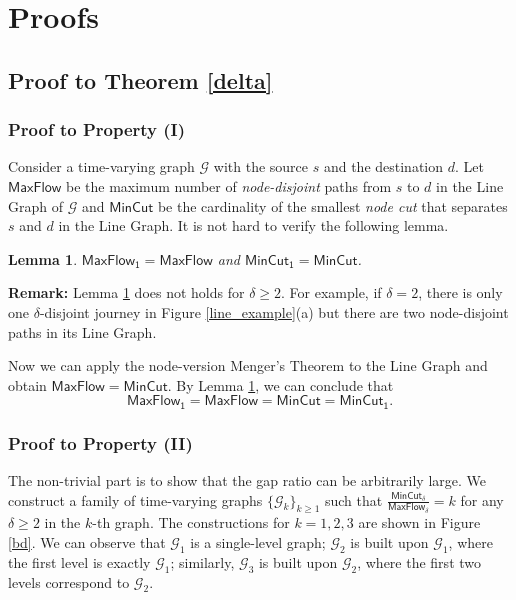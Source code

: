 \documentclass[10pt, conference, letterpaper]{IEEEtran}
\newtheorem{lemma}{Lemma}
\begin{document}
\appendix
\section{Proofs}
\subsection{Proof to Theorem \ref{delta}} \label{proof-delta}
\subsubsection{Proof to Property (I)}
Consider a time-varying graph $\mathcal{G}$ with the source $s$ and the destination $d$.
Let $\mathsf{MaxFlow}$ be the maximum number of \emph{node-disjoint} paths from $s$ to $d$ in the Line Graph of $\mathcal{G}$ and $\mathsf{MinCut}$ be the cardinality of the smallest \emph{node cut} that separates $s$ and $d$ in the Line Graph. It is not hard to verify the following lemma.
\begin{lemma}\label{line_eq}
$\mathsf{MaxFlow_1=MaxFlow}$ and $\mathsf{MinCut_1=MinCut}$.
\end{lemma}

\noindent \textbf{Remark:} Lemma \ref{line_eq} does not holds for $\delta\ge 2$. For example, if $\delta=2$, there is only one $\delta$-disjoint journey in Figure \ref{line_example}(a) but there are two node-disjoint paths in its Line Graph.

\vspace{1mm}

Now we can apply the node-version Menger's Theorem to the Line Graph and obtain $\mathsf{MaxFlow=MinCut}$. By Lemma \ref{line_eq}, we can conclude that
\[
\mathsf{MaxFlow_1=MaxFlow=MinCut=MinCut_1}.
\]
\subsubsection{Proof to Property (II)}
The non-trivial part is to show that the gap ratio can be arbitrarily large. We construct a family of time-varying graphs $\{\mathcal{G}_k\}_{k\ge 1}$  such that  $\frac{\mathsf{MinCut_{\delta}}}{\mathsf{MaxFlow_{\delta}}}= k$ for any $\delta\ge 2$ in the $k$-th graph. The constructions for $k=1,2,3$ are shown in Figure \ref{bd}. We can observe that $\mathcal{G}_1$ is a single-level graph; $\mathcal{G}_2$ is built upon $\mathcal{G}_1$, where the first level is exactly $\mathcal{G}_1$; similarly, $\mathcal{G}_3$ is built upon $\mathcal{G}_2$, where the first two levels correspond to $\mathcal{G}_2$.
\end{document}
